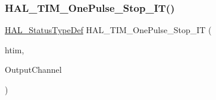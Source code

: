 \subsubsection{\texorpdfstring{H\+A\+L\+\_\+\+T\+I\+M\+\_\+\+One\+Pulse\+\_\+\+Stop\+\_\+\+I\+T()}{HAL\_TIM\_OnePulse\_Stop\_IT()}}
{\footnotesize\ttfamily \hyperlink{stm32f4xx__hal__def_8h_a63c0679d1cb8b8c684fbb0632743478f}{H\+A\+L\+\_\+\+Status\+Type\+Def} H\+A\+L\+\_\+\+T\+I\+M\+\_\+\+One\+Pulse\+\_\+\+Stop\+\_\+\+IT (\begin{DoxyParamCaption}\item[{\hyperlink{struct_t_i_m___handle_type_def}{T\+I\+M\+\_\+\+Handle\+Type\+Def} $\ast$}]{htim,  }\item[{uint32\+\_\+t}]{Output\+Channel }\end{DoxyParamCaption})}

